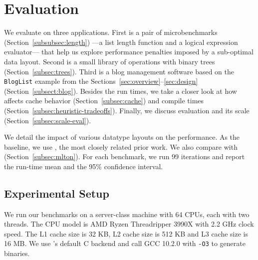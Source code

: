 \section{Evaluation}

We evaluate \system on three applications.
First is a pair of microbenchmarks (Section~\ref{subsubsec:length})
---a list length function and a logical expression evaluator---
that help us explore performance penalties imposed by a sub-optimal data layout.
%
Second is a small library of operations with binary trees (Section~\ref{subsec:trees}).
Third is a blog management software based on the \lstinline|BlogList| example from the
Sections~\ref{sec:overview}--\ref{sec:design} (Section~\ref{subsect:blog}).
Besides the run times, we take a closer look at how \system affects
cache behavior (Section~\ref{subsec:cache}) and compile times (Section~\ref{subsec:heuristic-tradeoffs}).
Finally, we discuss evaluation and its scale (Section~\ref{subsec:scale-eval}).

We detail the impact of various datatype layouts on the performance.
As the baseline, we use \gibbon, the most closely related prior work.
We also compare \system with \mlton (Section~\ref{subsec:mlton}).
For each benchmark, we run 99 iterations and report the run-time mean and
the 95\% confidence interval.

\subsection{Experimental Setup}
We run our benchmarks on a server-class machine with
64 CPUs, each with two threads. The CPU model is AMD Ryzen Threadripper 3990X with 2.2 GHz clock speed. The L1 cache size is 32 KB, L2 cache size is 512 KB and L3 cache size is 16 MB.
%
We use \gibbon's default C backend and call GCC 10.2.0 with \texttt{-O3} to generate binaries.

